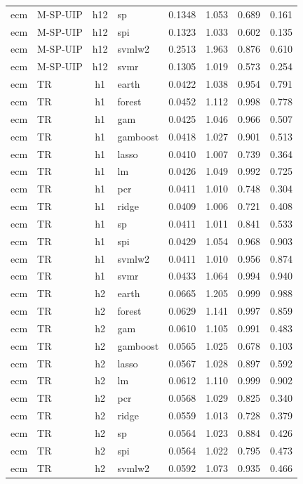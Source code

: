\begin{ThreePartTable}
\begin{longtable}[t]{llclcccc}
ecm & M-SP-UIP & h12 & sp & 0.1348 & 1.053 & 0.689 & 0.161\\
ecm & M-SP-UIP & h12 & spi & 0.1323 & 1.033 & 0.602 & 0.135\\
ecm & M-SP-UIP & h12 & svmlw2 & 0.2513 & 1.963 & 0.876 & 0.610\\
ecm & M-SP-UIP & h12 & svmr & 0.1305 & 1.019 & 0.573 & 0.254\\
\addlinespace
ecm & TR & h1 & earth & 0.0422 & 1.038 & 0.954 & 0.791\\
ecm & TR & h1 & forest & 0.0452 & 1.112 & 0.998 & 0.778\\
ecm & TR & h1 & gam & 0.0425 & 1.046 & 0.966 & 0.507\\
ecm & TR & h1 & gamboost & 0.0418 & 1.027 & 0.901 & 0.513\\
ecm & TR & h1 & lasso & 0.0410 & 1.007 & 0.739 & 0.364\\
ecm & TR & h1 & lm & 0.0426 & 1.049 & 0.992 & 0.725\\
ecm & TR & h1 & pcr & 0.0411 & 1.010 & 0.748 & 0.304\\
ecm & TR & h1 & ridge & 0.0409 & 1.006 & 0.721 & 0.408\\
ecm & TR & h1 & sp & 0.0411 & 1.011 & 0.841 & 0.533\\
ecm & TR & h1 & spi & 0.0429 & 1.054 & 0.968 & 0.903\\
ecm & TR & h1 & svmlw2 & 0.0411 & 1.010 & 0.956 & 0.874\\
ecm & TR & h1 & svmr & 0.0433 & 1.064 & 0.994 & 0.940\\
\addlinespace
ecm & TR & h2 & earth & 0.0665 & 1.205 & 0.999 & 0.988\\
ecm & TR & h2 & forest & 0.0629 & 1.141 & 0.997 & 0.859\\
ecm & TR & h2 & gam & 0.0610 & 1.105 & 0.991 & 0.483\\
ecm & TR & h2 & gamboost & 0.0565 & 1.025 & 0.678 & 0.103\\
ecm & TR & h2 & lasso & 0.0567 & 1.028 & 0.897 & 0.592\\
ecm & TR & h2 & lm & 0.0612 & 1.110 & 0.999 & 0.902\\
ecm & TR & h2 & pcr & 0.0568 & 1.029 & 0.825 & 0.340\\
ecm & TR & h2 & ridge & 0.0559 & 1.013 & 0.728 & 0.379\\
ecm & TR & h2 & sp & 0.0564 & 1.023 & 0.884 & 0.426\\
ecm & TR & h2 & spi & 0.0564 & 1.022 & 0.795 & 0.473\\
ecm & TR & h2 & svmlw2 & 0.0592 & 1.073 & 0.935 & 0.466\\

\end{longtable}
\end{ThreePartTable}
